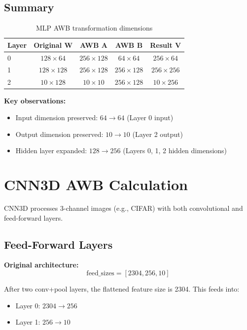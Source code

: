 \documentclass[11pt]{article}
\begin{document}
\subsection{Summary}

\begin{table}[h]
\centering
\begin{tabular}{@{}lcccc@{}}
\toprule
Layer & Original $\mathbf{W}$ & AWB $\mathbf{A}$ & AWB $\mathbf{B}$ & Result $\mathbf{V}$ \\
\midrule
0 & $128 \times 64$ & $256 \times 128$ & $64 \times 64$ & $256 \times 64$ \\
1 & $128 \times 128$ & $256 \times 128$ & $256 \times 128$ & $256 \times 256$ \\
2 & $10 \times 128$ & $10 \times 10$ & $256 \times 128$ & $10 \times 256$ \\
\bottomrule
\end{tabular}
\caption{MLP AWB transformation dimensions}
\end{table}

\textbf{Key observations:}
\begin{itemize}
    \item Input dimension preserved: $64 \rightarrow 64$ (Layer 0 input)
    \item Output dimension preserved: $10 \rightarrow 10$ (Layer 2 output)
    \item Hidden layer expanded: $128 \rightarrow 256$ (Layers 0, 1, 2 hidden dimensions)
\end{itemize}

\newpage

\section{CNN3D AWB Calculation}

CNN3D processes 3-channel images (e.g., CIFAR) with both convolutional and feed-forward layers.

\subsection{Feed-Forward Layers}

\textbf{Original architecture:}
\begin{equation}
\text{feed\_sizes} = [2304, 256, 10]
\end{equation}

After two conv+pool layers, the flattened feature size is 2304. This feeds into:
\begin{itemize}
    \item Layer 0: $2304 \rightarrow 256$
    \item Layer 1: $256 \rightarrow 10$
\end{itemize}
\end{document}
